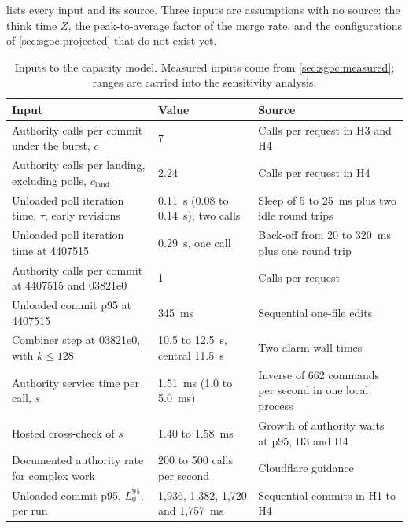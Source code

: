\documentclass[11pt,letterpaper]{article}
\theoremstyle{definition}
\theoremstyle{remark}
\begin{document}
 lists every input and its source. Three inputs are assumptions with no source: the think time $Z$, the peak-to-average factor of the merge rate, and the configurations of \cref{sec:sgoc:projected} that do not exist yet.

\begin{table}[t]
\centering
\caption{Inputs to the capacity model. Measured inputs come from \cref{sec:sgoc:measured}; ranges are carried into the sensitivity analysis.}
\label{tab:sgoc:inputs}
\small
\begin{tabularx}{\textwidth}{@{}L{5.4cm}L{3.3cm}Y@{}}
\toprule
Input & Value & Source \\
\midrule
Authority calls per commit under the burst, $c$ & 7 & Calls per request in H3 and H4 \\ %
Authority calls per landing, excluding polls, $c_{\mathrm{land}}$ & 2.24 & Calls per request in H4 \\ %
Unloaded poll iteration time, $\tau$, early revisions & 0.11~s (0.08 to 0.14~s), two calls & Sleep of 5 to 25~ms plus two idle round trips \\ %
Unloaded poll iteration time at 4407515 & 0.29~s, one call & Back-off from 20 to 320~ms plus one round trip \\ %
Authority calls per commit at 4407515 and 03821e0 & 1 & Calls per request \\ %
Unloaded commit p95 at 4407515 & 345~ms & Sequential one-file edits \\ %
Combiner step at 03821e0, with $k \le 128$ & 10.5 to 12.5~s, central 11.5~s & Two alarm wall times \\ %
Authority service time per call, $s$ & 1.51~ms (1.0 to 5.0~ms) & Inverse of 662 commands per second in one local process \\ %
Hosted cross-check of $s$ & 1.40 to 1.58~ms & Growth of authority waits at p95, H3 and H4 \\ %
Documented authority rate for complex work & 200 to 500 calls per second & Cloudflare guidance \cite{cfdorules} \\
Unloaded commit p95, $L_0^{95}$, per run & 1,936, 1,382, 1,720 and 1,757~ms & Sequential commits in H1 to H4 \\ %

\end{tabularx}
\end{table}
\end{document}

